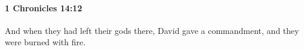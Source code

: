 
		\paragraph{1 Chronicles 14:12} %
			\label{1CHRONICLES-14-12}

			And when they had left their gods there, David gave a commandment, and they were burned with fire.



